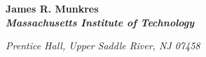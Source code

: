 \cleardoublepage
\thispagestyle{empty}
\vspace*{0.05\paperheight} %
\noindent
\begin{center}
\parbox{0.45\textwidth}{
    \centering
    \par %
    \vspace{0.5cm}
    \par %
}
\end{center}
\vspace*{\fill}
\newpage\null\thispagestyle{empty}\newpage

\cleardoublepage
\thispagestyle{empty}
\vspace*{0.05\paperheight}

\begin{center}
\parbox{0.7\textwidth}{\raggedleft
{}
\par
\vspace{0.5cm}
\par
}
\end{center}

\vspace{6cm}

\begin{center}
\parbox{0.7\textwidth}{\raggedleft
{\fontsize{24}{30}\selectfont\bfseries James R. Munkres} \\
\vspace{0.1cm}
{\fontsize{16}{10}\selectfont\textbf{\textsl{Massachusetts Institute of Technology}}}\par
}
\end{center}

\vfill
\begin{center}
{\large\textsl{Prentice Hall, Upper Saddle River, NJ 07458}\par}
\end{center}
\clearpage